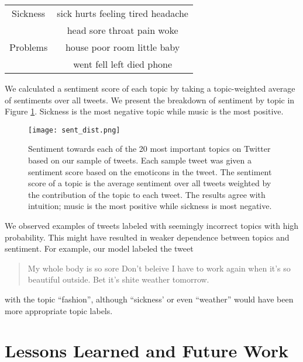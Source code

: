 \documentclass{sig-alternate-05-2015}
\begin{document}
\begin{table}
\begin{tabular}{|c|c|}
Sickness & sick hurts feeling tired headache \\
\quad & head sore throat pain woke \\ \hline
Problems & house poor room little baby \\
\quad & went fell left died phone \\ \hline
\end{tabular}
\end{table}

We calculated a sentiment score of each topic by taking a topic-weighted average of sentiments over all tweets.
%
We present the breakdown of sentiment by topic in Figure \ref{fig}.
%
Sickness is the most negative topic while music is the most positive.

\begin{figure}
\centering
\texttt{[image: sent\_dist.png]}
\caption{\label{fig} Sentiment towards each of the 20 most important topics on Twitter based on our sample of tweets. Each sample tweet was given a sentiment score based on the emoticons in the tweet. The sentiment score of a topic is the average sentiment over all tweets weighted by the contribution of the topic to each tweet. The results agree with intuition; music is the most positive while sickness is most negative.}
\end{figure}

We observed examples of tweets labeled with seemingly incorrect topics with high probability.
%
This might have resulted in weaker dependence between topics and sentiment.
%
For example, our model labeled the tweet
\begin{quote}
My whole body is so sore  Don't beleive I have to work again when it's so beautiful outside. Bet it's shite weather tomorrow.
\end{quote}
with the topic ``fashion'', although ``sickness' or even ``weather'' would have been more appropriate topic labels.

\section{Lessons Learned and Future Work}
\end{document}
